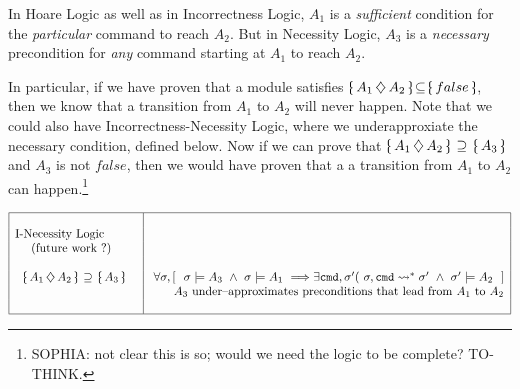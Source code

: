 \vspace{.1in} 

In Hoare Logic as well as in Incorrectness Logic, $A_1$ is a  \emph{sufficient} condition for  the 
\emph{particular} command  to reach $A_2$. 
But in Necessity Logic, $A_3$ is a \emph{necessary} precondition for \emph{any} command starting 
at $A_1$ to reach  $A_2$.

\vspace{.2in}

 

In particular, if we have proven that a module satisfies $\onlyIf{A_1}{A_2}{false}$, then we know that a transition from $A_1$ to $A_2$ will never happen. 
Note that we could also have Incorrectness-Necessity Logic, where we underapproxiate the necessary condition, defined below. Now if we can prove that $ \onlyIfIncorrect{A_1}{A_2}{A_3}$ and $A_3$ is not $false$, then we would have proven that a a transition from $A_1$ to $A_2$  can happen.\footnote{SOPHIA: not clear this is so; would we need the logic to be complete? TO-THINK.}

\noindent

$\begin{array}{|l|l|}
\hline
 & \\
 \mbox{I-Necessity Logic} & \\
 \ \ \ \ \mbox{(future work ?)}  &  
\\
 & \\
\ \ \onlyIfIncorrect{A_1}{A_2}{A_3}\ \ \ &\  \forall \sigma, [ \ \ \sigma \models A_3 \ \wedge\ \sigma \models A_1 \ \Longrightarrow \exists \prg{cmd}, \sigma' (\ \sigma, \prg{cmd} \leadsto^* \sigma' \ \wedge\ \sigma' \models A_2\ \  ]  \\\

 &  \ \ \ \ \ \   A_3 \mbox{ under--approximates   preconditions that lead from  $A_1$ to $A_2$}  \\
 & \\
\hline

\end{array}
$
